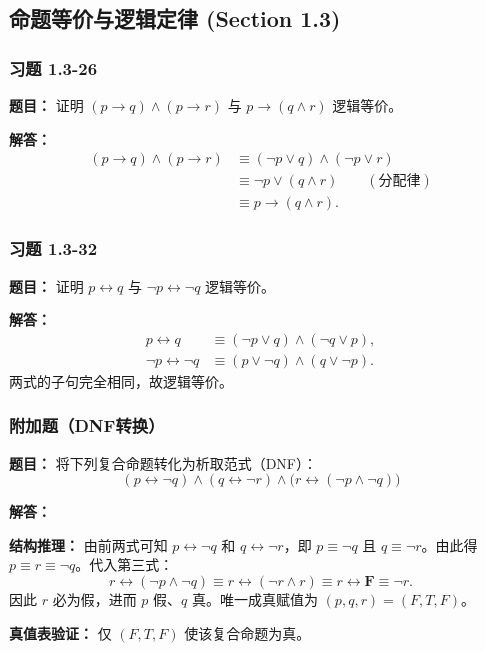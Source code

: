 \documentclass[11pt,UTF8]{article}
\begin{document}
\subsection{命题等价与逻辑定律 (Section 1.3)}

\subsubsection*{习题 1.3-26}
\textbf{题目：} 证明 $(p \to q) \land (p \to r)$ 与 $p \to (q \land r)$ 逻辑等价。

\textbf{解答：}
\begin{align*}
(p \to q) \land (p \to r)
&\equiv (\neg p \lor q) \land (\neg p \lor r) \\
&\equiv \neg p \lor (q \land r) \qquad (\text{分配律}) \\
&\equiv p \to (q \land r).
\end{align*}

\subsubsection*{习题 1.3-32}
\textbf{题目：} 证明 $p \leftrightarrow q$ 与 $\neg p \leftrightarrow \neg q$ 逻辑等价。

\textbf{解答：}
\begin{align*}
p \leftrightarrow q &\equiv (\neg p \lor q) \land (\neg q \lor p), \\
\neg p \leftrightarrow \neg q &\equiv (p \lor \neg q) \land (q \lor \neg p).
\end{align*}
两式的子句完全相同，故逻辑等价。

\subsubsection*{附加题（DNF转换）}
\textbf{题目：} 将下列复合命题转化为析取范式（DNF）：
\[ (p \leftrightarrow \neg q) \land (q \leftrightarrow \neg r) \land \bigl(r \leftrightarrow (\neg p \land \neg q)\bigr) \]

\textbf{解答：}

\textbf{结构推理：} 由前两式可知 $p \leftrightarrow \neg q$ 和 $q \leftrightarrow \neg r$，即 $p \equiv \neg q$ 且 $q \equiv \neg r$。由此得 $p \equiv r \equiv \neg q$。代入第三式：
\[ r \leftrightarrow (\neg p \land \neg q) \equiv r \leftrightarrow (\neg r \land r) \equiv r \leftrightarrow \mathbf{F} \equiv \neg r. \]
因此 $r$ 必为假，进而 $p$ 假、$q$ 真。唯一成真赋值为 $(p,q,r) = (F,T,F)$。

\textbf{真值表验证：} 仅 $(F,T,F)$ 使该复合命题为真。
\end{document}
